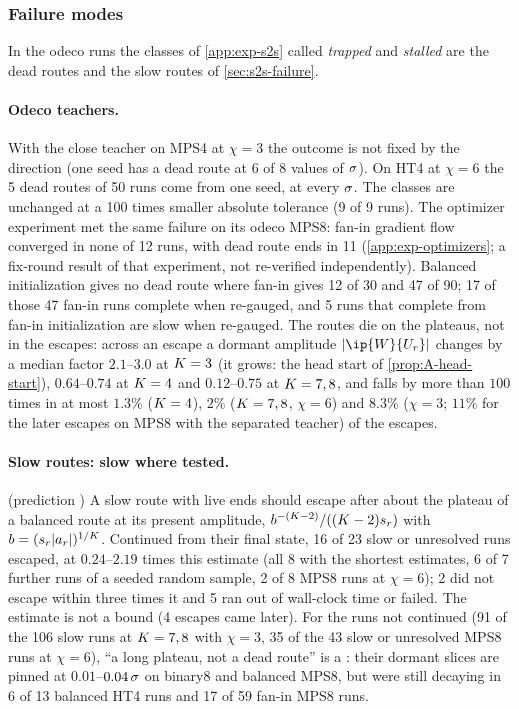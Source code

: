 \subsubsection{Failure modes}\label{app:supp-s2s-failure}
In the odeco runs the classes of \cref{app:exp-s2s} called \emph{trapped} and \emph{stalled} are the dead routes and
the slow routes of \cref{sec:s2s-failure}.

\paragraph{Odeco teachers.}
\empirical{} With the close teacher on MPS4 at $\chi=3$ the outcome is not fixed by the direction (one seed has a dead
route at 6 of 8 values of $\sigma$). On HT4 at $\chi=6$ the 5 dead routes of 50 runs come from one seed, at every
$\sigma$. The classes are unchanged at a 100 times smaller absolute tolerance (9 of 9 runs). The optimizer experiment
met the same failure on its odeco MPS8: fan-in gradient flow converged in none of 12 runs, with dead route ends in 11
(\cref{app:exp-optimizers}; a fix-round result of that experiment, not re-verified independently). Balanced initialization gives no dead route where fan-in gives 12 of 30 and 47 of 90; 17
of those 47 fan-in runs complete when re-gauged, and 5 runs that complete from fan-in initialization are slow when
re-gauged. The routes die on the plateaus, not in the escapes: across an escape a dormant amplitude
$\abs{\ip{\W}{\U r}}$ changes by a median factor $2.1$--$3.0$ at $K=3$ (it grows: the head start of
\cref{prop:A-head-start}), $0.64$--$0.74$ at $K=4$ and $0.12$--$0.75$ at $K=7,8$, and falls by more than $100$ times
in at most $1.3\%$ ($K=4$), $2\%$ ($K=7,8$, $\chi=6$) and $8.3\%$ ($\chi=3$; $11\%$ for the later escapes on MPS8
with the separated teacher) of the escapes.

\paragraph{Slow routes: slow where tested.}
\empirical{} (prediction \derived) \newresult{} A slow route with live ends should escape after about the plateau of a
balanced route at its present amplitude, $b^{-(K-2)}/((K-2)s_{r})$ with $b=(s_{r}\lvert a_{r}\rvert)^{1/K}$. Continued
from their final state, 16 of 23 slow or unresolved runs escaped, at $0.24$--$2.19$ times this estimate (all 8 with the
shortest estimates, 6 of 7 further runs of a seeded random sample, 2 of 8 MPS8 runs at $\chi=6$); 2 did not escape
within three times it and 5 ran out of wall-clock time or failed. The estimate is not a bound (4 escapes came later).
For the runs not continued (91 of the 106 slow runs at $K=7,8$ with $\chi=3$, 35 of the 43 slow or unresolved MPS8
runs at $\chi=6$), ``a long
plateau, not a dead route'' is a \conjecture: their dormant slices are pinned at $0.01$--$0.04\,\sigma$ on binary8 and
balanced MPS8, but were still decaying in 6 of 13 balanced HT4 runs and 17 of 59 fan-in MPS8 runs.

